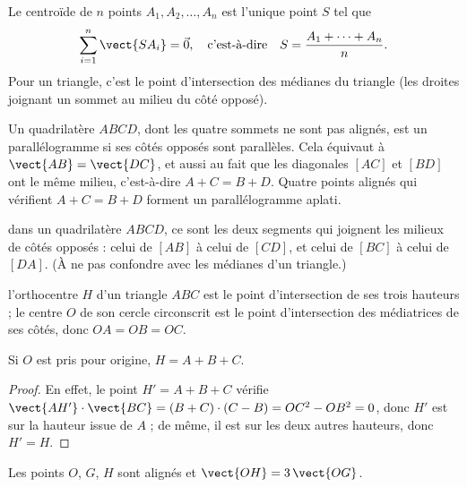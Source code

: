 \documentclass[11pt]{article}
\begin{document}
\begin{definition}\label{def:centroide}
Le centroïde de $n$ points $A_1, A_2, \ldots, A_n$ est l'unique point $S$ tel que
\[
\sum_{i=1}^{n} \vect{SA_i} = \vec{0},
\quad\text{c'est-à-dire}\quad S=\frac{A_1+\cdots+A_n}{n}.
\]
Pour un triangle, c'est le point d'intersection des médianes du triangle (les droites joignant un sommet au milieu du côté opposé).
\end{definition}

\begin{definition}[Parallélogramme]\label{def:parallelogramme}
Un quadrilatère $ABCD$, dont les quatre sommets ne sont pas alignés, est un parallélogramme si ses côtés opposés sont parallèles. Cela équivaut à $\vect{AB}=\vect{DC}$, et aussi au fait que les diagonales $[AC]$ et $[BD]$ ont le même milieu, c'est-à-dire $A+C=B+D$. Quatre points alignés qui vérifient $A+C=B+D$ forment un parallélogramme aplati.
\end{definition}

\begin{definition}\label{def:medianes-quadrilatere}
dans un quadrilatère $ABCD$, ce sont les deux segments qui joignent les milieux de côtés opposés : celui de $[AB]$ à celui de $[CD]$, et celui de $[BC]$ à celui de $[DA]$. (À ne pas confondre avec les médianes d'un triangle.)
\end{definition}

\begin{definition}\label{def:orthocentre}
l'orthocentre $H$ d'un triangle $ABC$ est le point d'intersection de ses trois hauteurs ; le centre $O$ de son cercle circonscrit est le point d'intersection des médiatrices de ses côtés, donc $OA=OB=OC$.
\end{definition}

\begin{proposition}[Orthocentre]\label{prop:orthocentre}
Si $O$ est pris pour origine, $H=A+B+C$.
\end{proposition}

\begin{proof}
En effet, le point $H'=A+B+C$ vérifie $\vect{AH'}\cdot\vect{BC}=(B+C)\cdot(C-B)=OC^2-OB^2=0$, donc $H'$ est sur la hauteur issue de $A$ ; de même, il est sur les deux autres hauteurs, donc $H'=H$.
\end{proof}

\begin{corollaire}\label{cor:euler}
Les points $O$, $G$, $H$ sont alignés et $\vect{OH}=3\,\vect{OG}$.
\end{corollaire}
\end{document}
